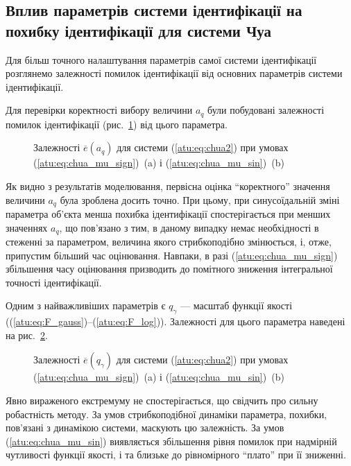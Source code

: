 

\subsection{Вплив параметрів системи ідентифікації на похибку ідентифікації для системи Чуа} %

Для більш точного налаштування параметрів самої системи
ідентифікації розглянемо залежності помилок ідентифікації
від основних параметрів системи ідентифікації.

Для перевірки коректності вибору величини
$a_q$ були побудовані залежності помилок ідентифікації
(рис.~\ref{atu:f:chua_e_a_q}) від цього параметра.


\begin{figure}[htb!]
  \caption{Залежності $\overline{e}(a_q) $ для системи (\ref{atu:eq:chua2}) при умовах (\ref{atu:eq:chua_mu_sign})~(a) і (\ref{atu:eq:chua_mu_sin})~(b)}
  \label{atu:f:chua_e_a_q}
\end{figure}

Як видно з результатів моделювання, первісна оцінка ``коректного'' значення величини
$a_q$ була зроблена досить точно. При цьому, при синусоїдальній
зміні параметра об'єкта менша похибка ідентифікації
спостерігається при менших значеннях
$a_q$, що пов'язано з тим, в даному випадку немає необхідності в
стеженні за параметром, величина якого стрибкоподібно змінюється,
і, отже, припустим більший час оцінювання. Навпаки, в разі
(\ref{atu:eq:chua_mu_sign}) збільшення часу оцінювання призводить до
помітного зниження інтегральної точності ідентифікації.


Одним з найважливіших параметрів є
$ q_\gamma $ --- масштаб функції якості
((\ref{atu:eq:F_gauss})--(\ref{atu:eq:F_log})).
Залежності для цього параметра наведені на рис.~\ref{atu:f:chua_e_qgamma}.

\begin{figure}[htb!]
  \caption{Залежності $ \overline{e} (q_\gamma) $ для системи (\ref{atu:eq:chua2}) при умовах (\ref{atu:eq:chua_mu_sign})~(a) і (\ref{atu:eq:chua_mu_sin})~(b)}
  \label{atu:f:chua_e_qgamma}
\end{figure}

Явно вираженого екстремуму не спостерігається, що свідчить про
сильну робастність методу. За умов стрибкоподібної динаміки
параметра, похибки, пов'язані з динамікою системи, маскують
цю залежність. За умов (\ref{atu:eq:chua_mu_sin}) виявляється збільшення
рівня помилок при надмірній чутливості функції якості, і та
близьке до рівномірного ``плато'' при її зниженні.

